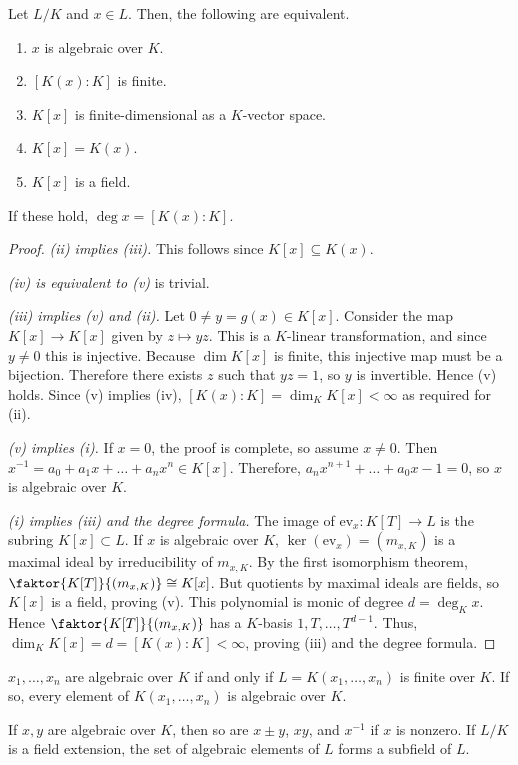 \begin{proposition}
	Let \( L / K \) and \( x \in L \).
	Then, the following are equivalent.
	\begin{enumerate}
		\item \( x \) is algebraic over \( K \).
		\item \( [K(x):K] \) is finite.
		\item \( K[x] \) is finite-dimensional as a \( K \)-vector space.
		\item \( K[x] = K(x) \).
		\item \( K[x] \) is a field.
	\end{enumerate}
	If these hold, \( \deg x = [K(x):K] \).
\end{proposition}
\begin{proof}
	\emph{(ii) implies (iii).} This follows since \( K[x] \subseteq K(x) \).

	\emph{(iv) is equivalent to (v)} is trivial.

	\emph{(iii) implies (v) and (ii).}
	Let \( 0 \neq y = g(x) \in K[x] \).
	Consider the map \( K[x] \to K[x] \) given by \( z \mapsto yz \).
	This is a \( K \)-linear transformation, and since \( y \neq 0 \) this is injective.
	Because \( \dim K[x] \) is finite, this injective map must be a bijection.
	Therefore there exists \( z \) such that \( yz = 1 \), so \( y \) is invertible.
	Hence (v) holds.
	Since (v) implies (iv), \( [K(x):K] = \dim_K K[x] < \infty \) as required for (ii).

	\emph{(v) implies (i).}
	If \( x = 0 \), the proof is complete, so assume \( x \neq 0 \).
	Then \( x^{-1} = a_0 + a_1 x + \dots + a_n x^n \in K[x] \).
	Therefore, \( a_n x^{n+1} + \dots + a_0 x - 1 = 0 \), so \( x \) is algebraic over \( K \).

	\emph{(i) implies (iii) and the degree formula.}
	The image of \( \mathrm{ev}_x \colon K[T] \to L \) is the subring \( K[x] \subset L \).
	If \( x \) is algebraic over \( K \), \( \ker(\mathrm{ev}_x) = (m_{x,K}) \) is a maximal ideal by irreducibility of \( m_{x,K} \).
	By the first isomorphism theorem, \( \faktor{K[T]}{(m_{x,K})} \cong K[x] \).
	But quotients by maximal ideals are fields, so \( K[x] \) is a field, proving (v).
	This polynomial is monic of degree \( d = \deg_K x \).
	Hence \( \faktor{K[T]}{(m_{x,K})} \) has a \( K \)-basis \( 1, T, \dots, T^{d-1} \).
	Thus, \( \dim_K K[x] = d = [K(x):K] < \infty \), proving (iii) and the degree formula.
\end{proof}
\begin{corollary}
	\( x_1, \dots, x_n \) are algebraic over \( K \) if and only if \( L = K(x_1, \dots, x_n) \) is finite over \( K \).
	If so, every element of \( K(x_1, \dots, x_n) \) is algebraic over \( K \).

	If \( x, y \) are algebraic over \( K \), then so are \( x \pm y \), \( xy \), and \( x^{-1} \) if \( x \) is nonzero.
	If \( L / K \) is a field extension, the set of algebraic elements of \( L \) forms a subfield of \( L \).
\end{corollary}
